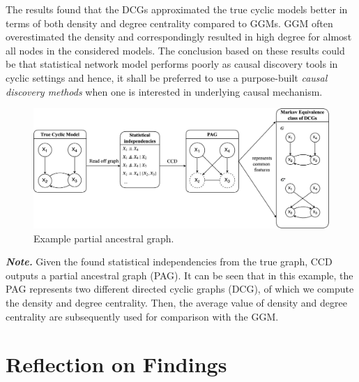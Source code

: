 \documentclass[
]{article}
\begin{document}
The results found that the DCGs approximated the true cyclic models better in terms of both density and degree centrality compared to GGMs. GGM often overestimated the density and correspondingly resulted in high degree for almost all nodes in the considered models. The conclusion based on these results could be that statistical network model performs poorly as causal discovery tools in cyclic settings and hence, it shall be preferred to use a purpose-built \emph{causal discovery methods} when one is interested in underlying causal mechanism.

\vspace{0.5cm}

\begin{figure}

{\centering \includegraphics[width=1.01\linewidth]{img/CCDsummary} 

}

\caption{Example partial ancestral graph.}\label{fig:pag}
\end{figure}



\vspace{-0.3cm}

\noindent\small\textit{\textbf{Note.}} Given the found statistical independencies from the true graph, CCD outputs a partial ancestral graph (PAG). It can be seen that in this example, the PAG represents two different directed cyclic graphs (DCG), of which we compute the density and degree centrality. Then, the average value of density and degree centrality are subsequently used for comparison with the GGM.

\normalsize
{}

\hypertarget{reflection-on-findings}{%
\section{Reflection on Findings}\label{reflection-on-findings}}
\end{document}
